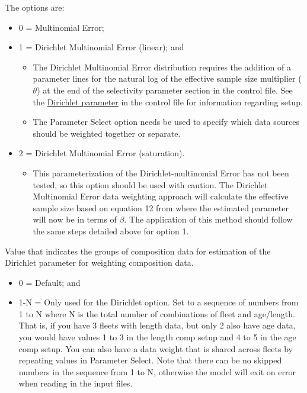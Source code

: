 The options are:
\begin{itemize}
	\item 0 = Multinomial Error;
	\item 1 = Dirichlet Multinomial Error (linear); and
	\begin{itemize}
		\item The Dirichlet Multinomial Error distribution requires the addition of a parameter lines for the natural log of the effective sample size multiplier ($\theta$) at the end of the selectivity parameter section in the control file. See the \hyperlink{Dirichletparameter}{Dirichlet parameter} in the control file for information regarding setup.
		\item The Parameter Select option needs be used to specify which data sources should be weighted together or separate. 
	\end{itemize}
	\item 2 = Dirichlet Multinomial Error (saturation).
	\begin{itemize}
		\item This parameterization of the Dirichlet-multinomial Error has not been tested, so this option should be used with caution. The Dirichlet Multinomial Error data weighting approach will calculate the effective sample size based on equation 12 from \citet{thorson-model-based-2017} where the estimated parameter will now be in terms of $\beta$. The application of this method should follow the same steps detailed above for option 1. 
	\end{itemize}
\end{itemize}


Value that indicates the groups of composition data for estimation of the Dirichlet 
parameter for weighting composition data.

\begin{itemize}
	\item 0 = Default; and
	\item 1-N = Only used for the Dirichlet option. Set to a sequence of numbers from 1 to N where N is the total number of combinations of fleet and age/length. That is, if you have 3 fleets with length data, but only 2 also have age data, you would have values 1 to 3 in the length comp setup and 4 to 5 in the age comp setup. You can also have a data weight that is shared across fleets by repeating values in Parameter Select. Note that there can be no skipped numbers in the sequence from 1 to N, otherwise the model will exit on error when reading in the input files.
\end{itemize}	

